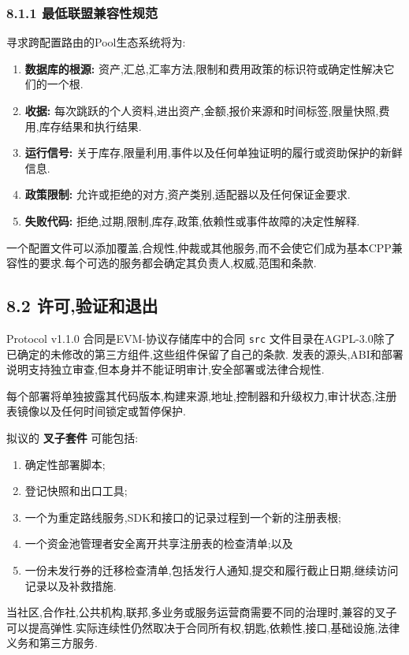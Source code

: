 \documentclass[11pt]{article}
\begin{document}
\subsubsection*{8.1.1 最低联盟兼容性规范}

寻求跨配置路由的Pool生态系统将为:

\begin{enumerate}[leftmargin=*]
\item \textbf{数据库的根源:} 资产,汇总,汇率方法,限制和费用政策的标识符或确定性解决它们的一个根.
\item \textbf{收据:} 每次跳跃的个人资料,进出资产,金额,报价来源和时间标签,限量快照,费用,库存结果和执行结果.
\item \textbf{运行信号:} 关于库存,限量利用,事件以及任何单独证明的履行或资助保护的新鲜信息.
\item \textbf{政策限制:} 允许或拒绝的对方,资产类别,适配器以及任何保证金要求.
\item \textbf{失败代码:} 拒绝,过期,限制,库存,政策,依赖性或事件故障的决定性解释.
\end{enumerate}
一个配置文件可以添加覆盖,合规性,仲裁或其他服务,而不会使它们成为基本CPP兼容性的要求.每个可选的服务都会确定其负责人,权威,范围和条款.

\subsection*{8.2 许可,验证和退出}

Protocol v1.1.0 合同是EVM-协议存储库中的合同 \texttt{src} 文件目录在AGPL-3.0除了已确定的未修改的第三方组件,这些组件保留了自己的条款. 发表的源头,ABI和部署说明支持独立审查,但本身并不能证明审计,安全部署或法律合规性.

每个部署将单独披露其代码版本,构建来源,地址,控制器和升级权力,审计状态,注册表镜像以及任何时间锁定或暂停保护.

拟议的 \textbf{叉子套件} 可能包括:

\begin{enumerate}[leftmargin=*]
\item 确定性部署脚本;
\item 登记快照和出口工具;
\item 一个为重定路线服务,SDK和接口的记录过程到一个新的注册表根;
\item 一个资金池管理者安全离开共享注册表的检查清单;以及
\item 一份未发行券的迁移检查清单,包括发行人通知,提交和履行截止日期,继续访问记录以及补救措施.
\end{enumerate}
当社区,合作社,公共机构,联邦,多业务或服务运营商需要不同的治理时,兼容的叉子可以提高弹性.实际连续性仍然取决于合同所有权,钥匙,依赖性,接口,基础设施,法律义务和第三方服务.
\end{document}
